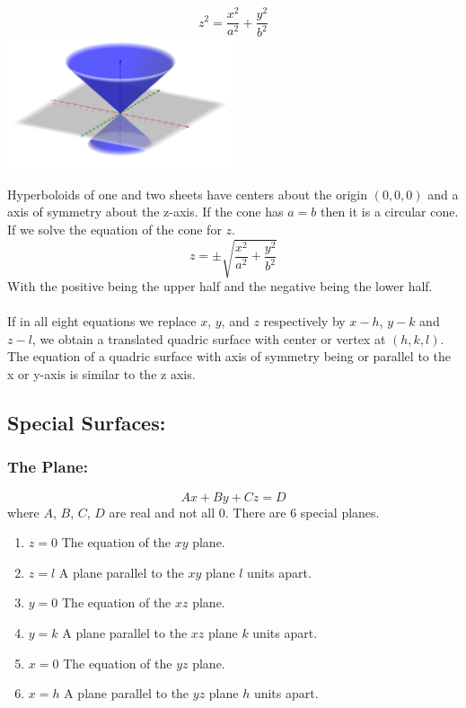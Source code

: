 \documentclass[14pt]{article}
\begin{document}
    \begin{multicols}{2}
        \begin{equation}z^2=\frac{x^2}{a^2}+\frac{y^2}{b^2}\end{equation}
        \includegraphics[width=0.5\textwidth]{Cone.png}
    \end{multicols}
    Hyperboloids of one and two sheets have centers about the origin
    $(0,0,0)$ and a axis of symmetry about the z-axis. If the cone has
    $a=b$ then it is a circular cone. If we solve the equation of the
    cone for $z$.
    $$z=\pm\sqrt{\frac{x^2}{a^2}+\frac{y^2}{b^2}}$$ With the positive
    being the upper half and the negative being the lower half.\\\\
    If in all eight equations we replace $x$, $y$, and $z$ respectively
    by $x-h$, $y-k$ and $z-l$, we obtain a translated quadric surface
    with center or vertex at $(h,k,l)$. The equation of a quadric
    surface with axis of symmetry being or parallel to the x or y-axis
    is similar to the z axis.
    \subsection{Special Surfaces:}
    \subsubsection{The Plane:}
    $$Ax+By+Cz=D$$ where $A$, $B$, $C$, $D$ are real and not all 0.
    There are 6 special planes.
    \begin{enumerate}
        \item $z=0$ The equation of the $xy$ plane.
        \item $z=l$ A plane parallel to the $xy$ plane $l$ units apart.
        \item $y=0$ The equation of the $xz$ plane.
        \item $y=k$ A plane parallel to the $xz$ plane $k$ units apart.
        \item $x=0$ The equation of the $yz$ plane.
        \item $x=h$ A plane parallel to the $yz$ plane $h$ units apart.
    \end{enumerate}
\end{document}
